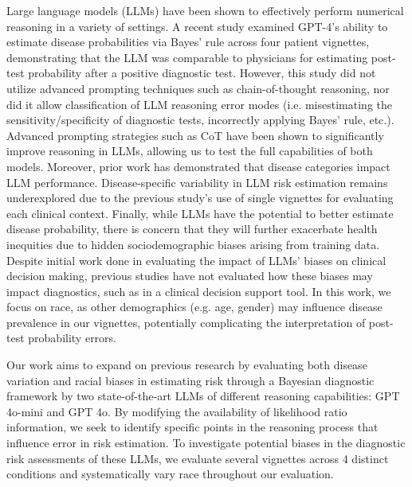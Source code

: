 Large language models (LLMs) have been shown to effectively perform numerical reasoning in a variety of settings\citep{imaniMathPrompterMathematicalReasoning2023, lewkowyczSolvingQuantitativeReasoning2024}. A recent study examined GPT-4’s ability to estimate disease probabilities via Bayes’ rule across four patient vignettes, demonstrating that the LLM was comparable to physicians for estimating post-test probability after a positive diagnostic test\citep{clusmannFutureLandscapeLarge2023}. However, this study did not utilize advanced prompting techniques such as chain-of-thought reasoning\citep{rodmanArtificialIntelligenceVs2023}, nor did it allow classification of LLM reasoning error modes (i.e. misestimating the sensitivity/specificity of diagnostic tests, incorrectly applying Bayes’ rule, etc.). Advanced prompting strategies such as CoT have been shown to significantly improve reasoning in LLMs, allowing us to test the full capabilities of both models\citep{weiChainthoughtPromptingElicits2024}. Moreover, prior work has demonstrated that disease categories impact LLM performance\citep{thirunavukarasuTriallingLargeLanguage2023}. Disease-specific variability in LLM risk estimation remains underexplored due to the previous study’s use of single vignettes for evaluating each clinical context\citep{morganAccuracyPractitionerEstimates2021}. Finally, while LLMs have the potential to better estimate disease probability, there is concern that they will further exacerbate health inequities due to hidden sociodemographic biases arising from training data\citep{clusmannFutureLandscapeLarge2023, liEthicsLargeLanguage2023, zackAssessingPotentialGPT42024, nastasiVignettebasedEvaluationChatGPTs2023}. Despite initial work done in evaluating the impact of LLMs’ biases on clinical decision making, previous studies have not evaluated how these biases may impact diagnostics, such as in a clinical decision support tool. In this work, we focus on race, as other demographics (e.g. age, gender) may  influence disease prevalence in our vignettes, potentially complicating the interpretation of post-test probability errors.

Our work aims to expand on previous research by evaluating both disease variation and racial biases in estimating risk through a Bayesian diagnostic framework by two state-of-the-art LLMs of different reasoning capabilities: GPT 4o-mini and GPT 4o. By modifying the availability of likelihood ratio information, we seek to identify specific points in the reasoning process that influence error in risk estimation. To investigate potential biases in the diagnostic risk assessments of these LLMs, we evaluate several vignettes across 4 distinct conditions and systematically vary race throughout our evaluation.

